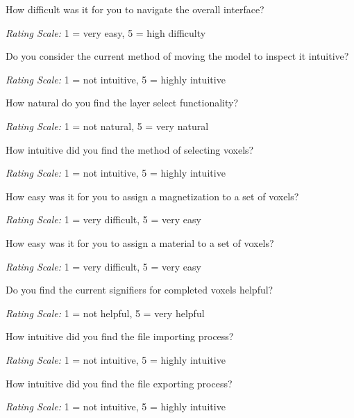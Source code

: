 \documentclass{article}
\begin{document}
\begin{description}[leftmargin=2.5cm, labelwidth=1.2cm, labelsep=0.5cm]

    \item[\hypertarget{question:T1}{Question 1:}] How difficult was it for you to navigate the overall interface?
    \item[] \hspace{0.7cm} \textit{Rating Scale:} 1 = very easy, 5 = high difficulty 
    \item[\hypertarget{question:T2}{Question 2:}] Do you consider the current method of moving the model to inspect it intuitive?
    \item[] \hspace{0.7cm} \textit{Rating Scale:} 1 = not intuitive, 5 = highly intuitive 
    \item[\hypertarget{question:T3}{Question 3:}] How natural do you find the layer select functionality?
    \item[] \hspace{0.7cm} \textit{Rating Scale:} 1 = not natural, 5 = very natural 
    \item[\hypertarget{question:T4}{Question 4:}]  How intuitive did you find the method of selecting voxels?
    \item[] \hspace{0.7cm} \textit{Rating Scale:} 1 = not intuitive, 5 = highly intuitive 
    \item[\hypertarget{question:T5}{Question 5:}] How easy was it for you to assign a magnetization to a set of voxels?
    \item[] \hspace{0.7cm} \textit{Rating Scale:} 1 = very difficult, 5 = very easy 
    \item[\hypertarget{question:T6}{Question 6:}] How easy was it for you to assign a material to a set of voxels?
    \item[] \hspace{0.7cm} \textit{Rating Scale:} 1 = very difficult, 5 = very easy 
    \item[\hypertarget{question:T7}{Question 7:}] Do you find the current signifiers for completed voxels helpful?
    \item[] \hspace{0.7cm} \textit{Rating Scale:} 1 = not helpful, 5 = very helpful 
    \item[\hypertarget{question:T8}{Question 8:}] How intuitive did you find the file importing process?
    \item[] \hspace{0.7cm} \textit{Rating Scale:} 1 = not intuitive, 5 = highly intuitive  
    \item[\hypertarget{question:T9}{Question 9:}] How intuitive did you find the file exporting process?
    \item[] \hspace{0.7cm} \textit{Rating Scale:} 1 = not intuitive, 5 = highly intuitive 

\end{description}
\end{document}
